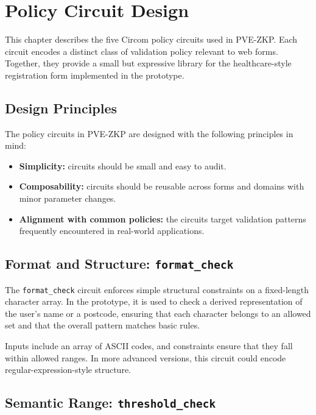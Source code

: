 
\chapter{Policy Circuit Design}

This chapter describes the five Circom policy circuits used in PVE-ZKP. Each
circuit encodes a distinct class of validation policy relevant to web forms.
Together, they provide a small but expressive library for the healthcare-style
registration form implemented in the prototype.

\section{Design Principles}

The policy circuits in PVE-ZKP are designed with the following principles in
mind:

\begin{itemize}[leftmargin=*]
  \item \textbf{Simplicity:} circuits should be small and easy to audit.
  \item \textbf{Composability:} circuits should be reusable across forms and
    domains with minor parameter changes.
  \item \textbf{Alignment with common policies:} the circuits target validation
    patterns frequently encountered in real-world applications.
\end{itemize}

\section{Format and Structure: \texttt{format\_check}}

The \texttt{format\_check} circuit enforces simple structural constraints on a
fixed-length character array. In the prototype, it is used to check a derived
representation of the user's name or a postcode, ensuring that each character
belongs to an allowed set and that the overall pattern matches basic rules.

Inputs include an array of ASCII codes, and constraints ensure that they fall
within allowed ranges. In more advanced versions, this circuit could encode
regular-expression-style structure.

\section{Semantic Range: \texttt{threshold\_check}}

